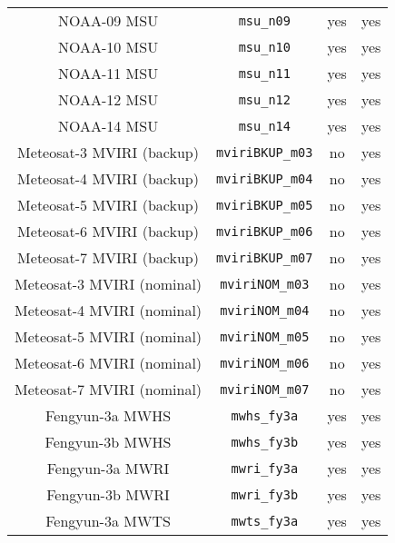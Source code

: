 \begin{center}
\begin{longtable}{c c c c}
  NOAA-09 MSU                        & \texttt{msu\_n09}            &  yes     &  yes       \\
  NOAA-10 MSU                        & \texttt{msu\_n10}            &  yes     &  yes       \\
  NOAA-11 MSU                        & \texttt{msu\_n11}            &  yes     &  yes       \\
  NOAA-12 MSU                        & \texttt{msu\_n12}            &  yes     &  yes       \\
  NOAA-14 MSU                        & \texttt{msu\_n14}            &  yes     &  yes       \\
  Meteosat-3 MVIRI (backup)          & \texttt{mviriBKUP\_m03}      &  no      &  yes       \\
  Meteosat-4 MVIRI (backup)          & \texttt{mviriBKUP\_m04}      &  no      &  yes       \\
  Meteosat-5 MVIRI (backup)          & \texttt{mviriBKUP\_m05}      &  no      &  yes       \\
  Meteosat-6 MVIRI (backup)          & \texttt{mviriBKUP\_m06}      &  no      &  yes       \\
  Meteosat-7 MVIRI (backup)          & \texttt{mviriBKUP\_m07}      &  no      &  yes       \\
  Meteosat-3 MVIRI (nominal)         & \texttt{mviriNOM\_m03}       &  no      &  yes       \\
  Meteosat-4 MVIRI (nominal)         & \texttt{mviriNOM\_m04}       &  no      &  yes       \\
  Meteosat-5 MVIRI (nominal)         & \texttt{mviriNOM\_m05}       &  no      &  yes       \\
  Meteosat-6 MVIRI (nominal)         & \texttt{mviriNOM\_m06}       &  no      &  yes       \\
  Meteosat-7 MVIRI (nominal)         & \texttt{mviriNOM\_m07}       &  no      &  yes       \\
  Fengyun-3a MWHS                    & \texttt{mwhs\_fy3a}          &  yes     &  yes       \\
  Fengyun-3b MWHS                    & \texttt{mwhs\_fy3b}          &  yes     &  yes       \\
  Fengyun-3a MWRI                    & \texttt{mwri\_fy3a}          &  yes     &  yes       \\
  Fengyun-3b MWRI                    & \texttt{mwri\_fy3b}          &  yes     &  yes       \\
  Fengyun-3a MWTS                    & \texttt{mwts\_fy3a}          &  yes     &  yes       \\

\end{longtable}
\end{center}

